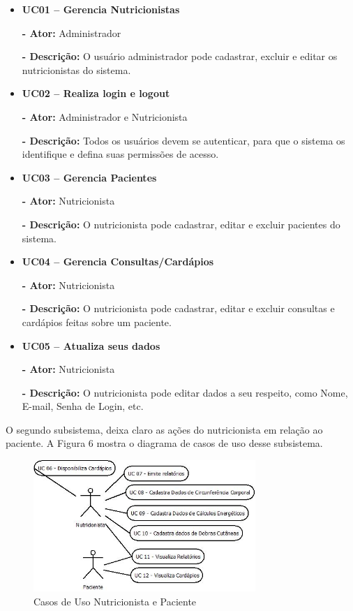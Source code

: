 \documentclass[
	12pt,				%
    oneside,			%
	a4paper,			%
	english,			%
	french,				%
	spanish,			%
	brazil,				%
	]{abntex2}
\begin{document}
\begin{itemize}
\item \textbf{UC01 – Gerencia Nutricionistas}

\textbf{- Ator:} Administrador

\textbf{- Descrição:} O usuário administrador pode cadastrar, excluir e
editar os nutricionistas do sistema.

\item \textbf{UC02 – Realiza login e logout}

\textbf{- Ator:} Administrador e Nutricionista

\textbf{- Descrição:} Todos os usuários devem se autenticar, para que o
sistema os identifique e defina suas permissões de acesso.

\item \textbf{UC03 – Gerencia Pacientes}

\textbf{- Ator:} Nutricionista

\textbf{- Descrição:} O nutricionista pode cadastrar, editar e excluir
pacientes do sistema.

\item \textbf{UC04 – Gerencia Consultas/Cardápios}

\textbf{- Ator:} Nutricionista

\textbf{- Descrição:} O nutricionista pode cadastrar, editar e excluir
consultas e cardápios feitas sobre um paciente.

\item \textbf{UC05 – Atualiza seus dados}

\textbf{- Ator:} Nutricionista

\textbf{- Descrição:} O nutricionista pode editar dados a seu respeito,
como Nome, E-mail, Senha de Login, etc.

\end{itemize}

O segundo subsistema, deixa claro as ações do nutricionista em relação ao
paciente. A Figura 6 mostra o diagrama de casos de uso desse subsistema.

\begin{figure} [hbt] 
\label{table1} 
\caption{Casos de Uso Nutricionista e Paciente}
\begin{center}
\includegraphics[width=0.75\textwidth]{uc2.jpeg}
\end{center}
\end{figure}
\end{document}
